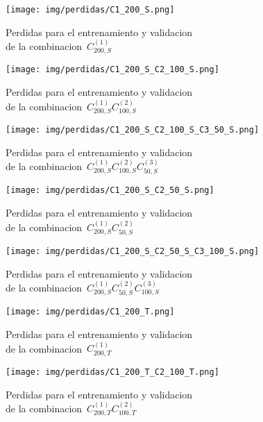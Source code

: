 \begin{figure}[H]
    \centerline{\texttt{[image: img/perdidas/C1\_200\_S.png]}}
    \caption{Perdidas para el entrenamiento y validacion\\ de la combinacion~$C^{(1)}_{200,S}$}
    \label{fig:C1_200_S}
\end{figure}

\begin{figure}[H]
    \centerline{\texttt{[image: img/perdidas/C1\_200\_S\_C2\_100\_S.png]}}
    \caption{Perdidas para el entrenamiento y validacion\\ de la combinacion~$C^{(1)}_{200,S}C^{(2)}_{100,S}$}
    \label{fig:C1_200_S_C2_100_S}
\end{figure}

\begin{figure}[H]
    \centerline{\texttt{[image: img/perdidas/C1\_200\_S\_C2\_100\_S\_C3\_50\_S.png]}}
    \caption{Perdidas para el entrenamiento y validacion\\ de la combinacion~$C^{(1)}_{200,S}C^{(2)}_{100,S}C^{(3)}_{50,S}$}
    \label{fig:C1_200_S_C2_100_S_C3_50_S}
\end{figure}

\begin{figure}[H]
    \centerline{\texttt{[image: img/perdidas/C1\_200\_S\_C2\_50\_S.png]}}
    \caption{Perdidas para el entrenamiento y validacion\\ de la combinacion~$C^{(1)}_{200,S}C^{(2)}_{50,S}$}
    \label{fig:C1_200_S_C2_50_S}
\end{figure}

\begin{figure}[H]
    \centerline{\texttt{[image: img/perdidas/C1\_200\_S\_C2\_50\_S\_C3\_100\_S.png]}}
    \caption{Perdidas para el entrenamiento y validacion\\ de la combinacion~$C^{(1)}_{200,S}C^{(2)}_{50,S}C^{(3)}_{100,S}$}
    \label{fig:C1_200_S_C2_50_S_C3_100_S}
\end{figure}

\begin{figure}[H]
    \centerline{\texttt{[image: img/perdidas/C1\_200\_T.png]}}
    \caption{Perdidas para el entrenamiento y validacion\\ de la combinacion~$C^{(1)}_{200,T}$}
    \label{fig:C1_200_T}
\end{figure}

\begin{figure}[H]
    \centerline{\texttt{[image: img/perdidas/C1\_200\_T\_C2\_100\_T.png]}}
    \caption{Perdidas para el entrenamiento y validacion\\ de la combinacion~$C^{(1)}_{200,T}C^{(2)}_{100,T}$}
    \label{fig:C1_200_T_C2_100_T}
\end{figure}

